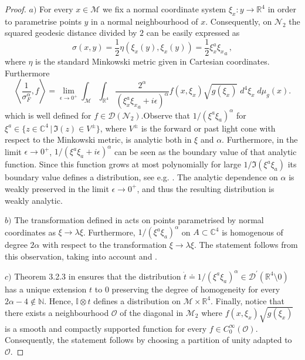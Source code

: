 \documentclass[11pt]{book}
\newcommand{\Dcal}{\mathcal{D}}
\newcommand{\Mcal}{\mathcal{M}}
\newcommand{\Ncal}{\mathcal{N}}
\newcommand{\Ocal}{\mathcal{O}}
\newcommand{\Nbb}{\mathbb{N}}
\newcommand{\Rbb}{\mathbb{R}}
\theoremstyle{break}
\begin{document}
\begin{proof}
$a)$ For every $x \in \Mcal$ we fix a normal coordinate system $\xi_x:y\to{\mathbb{R}^4}$ in order to parametrise points $y$ in a normal neighbourhood of $x$. Consequently, on $\Ncal_2$ the squared geodesic distance divided by $2$ can be easily expressed as
\[
\sigma(x,y)= \frac{1}{2}\eta(\xi_x(y),\xi_x(y)) = \frac{1}{2}\xi_x^{a}{\xi_x}_{a}\,,
\]
where $\eta$ is the standard Minkowski metric given in Cartesian coordinates. Furthermore\[%
\left\langle \frac{1}{\sigma^\alpha_F}, f \right\rangle = 
\lim_{\epsilon\to0^+ } \int_\Mcal \int_{\mathbb{R}^4}  \frac{2^{\alpha}}{(\xi_x^a{\xi_{x}}_a+i\epsilon)^{\alpha}} f(x,\xi_x) \sqrt{g(\xi_x)}\; d^4\xi_x\; d\mu_g (x).
\]which is well defined for $f\in\Dcal(\Ncal_2)$.Observe that $1/(\xi^{a}{\xi}_{a})^\alpha$  for $\xi^{a}\in \{z\in \mathbb{C}^4 \,|\,\Im(z) \in V^\pm \}$, where $V^\pm$ is the forward or past light cone with respect to the Minkowski metric, is  analytic both in $\xi$ and $\alpha$.  Furthermore, in the limit $\epsilon\to0^+$,  $1/(\xi^{a}{\xi}_{a} + i \epsilon)^\alpha$ can be seen as the boundary value of that analytic function. Since this function grows at most polynomially for large $1/\Im(\xi^a\xi_a)$ its boundary value defines a distribution, see e.g. %
. The analytic dependence on $\alpha$ is weakly preserved in the limit $\epsilon\to0^+$, and thus the resulting distribution is weakly analytic. \par%
%
\bigskip
%
$b)$  The transformation defined in %
acts on points parametrised by normal coordinates as $\xi \to \lambda \xi $. Furthermore, $1/(\xi^{a}{\xi}_{a})^\alpha$ on $A \subset \mathbb{C}^4$ is homogenous of degree $2\alpha$ with respect to the transformation $\xi\to \lambda \xi$. The statement follows from this observation, taking into account %
and %
.

\bigskip

$c)$ Theorem 3.2.3 in %
ensures that the distribution $\dot{t}\doteq1/(\xi^{a}{\xi}_{a})^\alpha\in\Dcal^\prime(\Rbb^4\setminus  0)$ has a unique extension $t$ to $0$ preserving the degree of homogeneity for every $2\alpha-4 \notin \Nbb$. 
Hence, $\mathbb{I}\otimes t$ defines a distribution on $\Mcal \times \Rbb^4$.
Finally, notice that there exists a neighbourhood $\Ocal$ of the diagonal in $\Mcal_2$
where $f(x,\xi_x) \sqrt{g(\xi_x)}$ is a smooth and compactly supported function for every $f\in C^\infty_0(\Ocal)$. Consequently, the statement follows by choosing a partition of unity adapted to $\Ocal$.








\end{proof}
\end{document}
